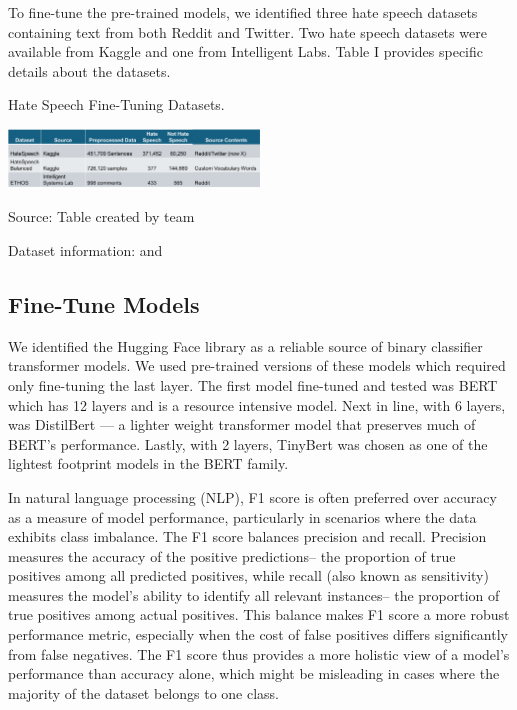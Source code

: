 \documentclass[conference]{IEEEtran}
\begin{document}
To fine-tune the pre-trained models, we identified three hate speech datasets containing text from both Reddit and Twitter. Two hate speech datasets were available from Kaggle\cite{b8} and one from Intelligent Labs\cite{b9}. Table I provides specific details about the datasets.

\begin{table}[h!]
  \caption{Hate Speech Fine-Tuning Datasets.}
  \label{tab:datasets}
  \centering\includegraphics[width=0.5\textwidth]{tabledatasets.png}
  \caption*{Source: Table created by team}
  \caption*{Dataset information: \cite{b8} and \cite{b9}}
\end{table}

\subsection{Fine-Tune Models}
We identified the Hugging Face library\cite{b18} as a reliable source of binary classifier transformer models. We used pre-trained versions of these models which required only fine-tuning the last layer. The first model fine-tuned and tested was BERT which has 12 layers and is  a resource intensive model. Next in line, with 6 layers, was DistilBert --- a lighter weight transformer model that preserves much of BERT's performance\cite{b16}. Lastly, with 2 layers, TinyBert was chosen as one of the lightest footprint models in the BERT family.

In natural language processing (NLP), F1 score is often preferred over accuracy as a measure of model performance, particularly in scenarios where the data exhibits class imbalance. The F1 score balances precision and recall. Precision measures the accuracy of the positive predictions-- the proportion of true positives among all predicted positives, while recall (also known as sensitivity) measures the model's ability to identify all relevant instances-- the proportion of true positives among actual positives\cite{b19}. This balance makes F1 score a more robust performance metric, especially when the cost of false positives differs significantly from false negatives. The F1 score thus provides a more holistic view of a model's performance than accuracy alone, which might be misleading in cases where the majority of the dataset belongs to one class\cite{b19}.
\end{document}

